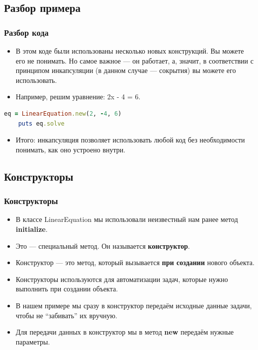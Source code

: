 \documentclass[compress,red]{beamer}
\begin{document}
\subsection{Разбор примера}
\begin{frame}[fragile]
  \frametitle{Разбор кода}
  \begin{itemize}
    \item В этом коде были использованы несколько новых конструкций. Вы можете его не понимать. Но самое важное --- он работает, а, значит, в соответствии с принципом инкапсуляции (в данном случае --- сокрытия) вы можете его использовать.
    \item Например, решим уравнение: 2x - 4 = 6.
  \end{itemize}
  \scriptsize{
  \begin{lstlisting}[language=ruby,basicstyle=\footnotesize,label=ruby5,caption=Используем код]
    eq = LinearEquation.new(2, -4, 6)
    puts eq.solve
  \end{lstlisting}
  \begin{itemize}
    \item Итого: инкапсуляция позволяет использовать любой код без необходимости понимать, как оно устроено внутри.
  \end{itemize}
  }
\end{frame}

\subsection{Конструкторы}
\begin{frame}[fragile]
  \frametitle{Конструкторы}
  \begin{itemize}
    \item В классе LinearEquation мы использовали неизвестный нам ранее метод \textbf{initialize}. 
    \item Это --- специальный метод. Он называется \textbf{конструктор}.
    \item Конструктор --- это метод, который вызывается \textbf{при создании} нового объекта.
    \item Конструкторы используются для автоматизации задач, которые нужно выполнить при создании объекта.
    \item В нашем примере мы сразу в конструктор передаём исходные данные задачи, чтобы не ``забивать'' их вручную.
    \item Для передачи данных в конструктор мы в метод \textbf{new} передаём нужные параметры.
  \end{itemize}
\end{frame}
\end{document}
